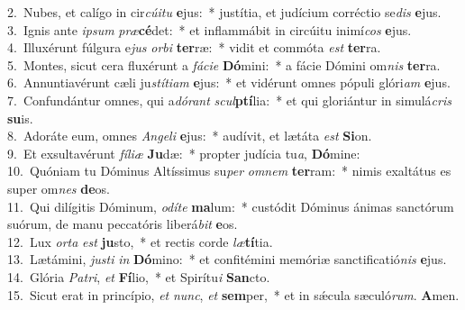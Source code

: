{2.~}Nubes, et calígo in cir\textit{cú}\textit{i}\textit{tu} \textbf{e}jus:~* justítia, et judícium corréctio se\textit{dis} \textbf{e}jus.\\
{3.~}Ignis ante \textit{i}\textit{psum} \textit{præ}\textbf{cé}det:~* et inflammábit in circúitu inimí\textit{cos} \textbf{e}jus.\\
{4.~}Illuxérunt fúlgura e\textit{jus} \textit{or}\textit{bi} \textbf{ter}ræ:~* vidit et commóta \textit{est} \textbf{ter}ra.\\
{5.~}Montes, sicut cera fluxérunt a \textit{fá}\textit{ci}\textit{e} \textbf{Dó}mini:~* a fácie Dómini om\textit{nis} \textbf{ter}ra.\\
{6.~}Annuntiavérunt cæli ju\textit{stí}\textit{ti}\textit{am} \textbf{e}jus:~* et vidérunt omnes pópuli glóri\textit{am} \textbf{e}jus.\\
{7.~}Confundántur omnes, qui a\textit{dó}\textit{rant} \textit{scul}\textbf{ptí}lia:~* et qui gloriántur in simulá\textit{cris} \textbf{su}is.\\
{8.~}Adoráte eum, omnes \textit{An}\textit{ge}\textit{li} \textbf{e}jus:~* audívit, et lætáta \textit{est} \textbf{Si}on.\\
{9.~}Et exsultavérunt \textit{fí}\textit{li}\textit{æ} \textbf{Ju}dæ:~* propter judícia tu\textit{a}, \textbf{Dó}mine:\\
{10.~}Quóniam tu Dóminus Altíssimus su\textit{per} \textit{om}\textit{nem} \textbf{ter}ram:~* nimis exaltátus es super om\textit{nes} \textbf{de}os.\\
{11.~}Qui dilígitis Dóminum, \textit{o}\textit{dí}\textit{te} \textbf{ma}lum:~* custódit Dóminus ánimas sanctórum suórum, de manu peccatóris liberá\textit{bit} \textbf{e}os.\\
{12.~}Lux \textit{or}\textit{ta} \textit{est} \textbf{ju}sto,~* et rectis corde \textit{læ}\textbf{tí}tia.\\
{13.~}Lætámini, \textit{ju}\textit{sti} \textit{in} \textbf{Dó}mino:~* et confitémini memóriæ sanctificatió\textit{nis} \textbf{e}jus.\\
{14.~}Glória \textit{Pa}\textit{tri}, \textit{et} \textbf{Fí}lio,~* et Spirítu\textit{i} \textbf{San}cto.\\
{15.~}Sicut erat in princípio, \textit{et} \textit{nunc}, \textit{et} \textbf{sem}per,~* et in sǽcula sæculó\textit{rum}. \textbf{A}men.\\

